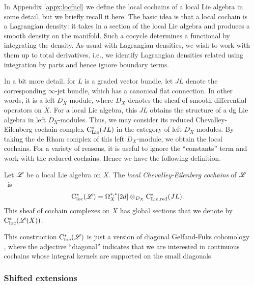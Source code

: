 In Appendix \ref{appx:locfncl} we define the local cochains of a local Lie algebra in some detail, 
but we briefly recall it here.
The basic idea is that a local cochain is a Lagrangian density: 
it takes in a section of the local Lie algebra and produces a smooth density on the manifold. 
Such a cocycle determines a functional by integrating the density.
As usual with Lagrangian densities, we wish to work with them up to total derivatives,
i.e., we identify Lagrangian densities related using integration by parts and hence ignore boundary terms.

In a bit more detail, for $L$ is a graded vector bundle, let $JL$ denote the corresponding $\infty$-jet bundle,
which has a canonical flat connection.
In other words, it is a left $D_X$-module, where $D_X$ denotes the sheaf of smooth differential operators on $X$.
For a local Lie algebra, this $JL$ obtains the structure of a dg Lie algebra in left $D_X$-modules.
Thus, we may consider its reduced Chevalley-Eilenberg cochain complex ${\rm C}_{\rm Lie}^*(JL)$ in the category of left $D_X$-modules. 
By taking the de Rham complex of this left $D_X$-module, we obtain the local cochains.
For a variety of reasons, it is useful to ignore the ``constants'' term and work with the reduced cochains.
Hence we have the following definition.

\begin{dfn}
Let $\mathscr L$ be a local Lie algebra on $X$.
The {\em local Chevalley-Eilenberg cochains}  of $\mathscr L$~is 
\[
{\rm C}_{\rm loc}^*(\mathscr L) = \Omega^{*,*}_X[2d] \otimes_{D_X} {\rm C}_{\rm Lie, red}^*(J L) .
\]
This sheaf of cochain complexes on $X$ has global sections that we denote by~${\rm C}_{\rm loc}^*(\mathscr L(X))$.
\end{dfn}

\begin{rmk}
This construction ${\rm C}_{\rm loc}^*(\mathscr L)$ is just a version of diagonal Gelfand-Fuks cohomology \cite{Fuks, LosikDiag},
where the adjective ``diagonal'' indicates that we are interested in continuous cochains whose integral kernels are supported on the small diagonals.
\end{rmk}

\subsubsection{Shifted extensions}

